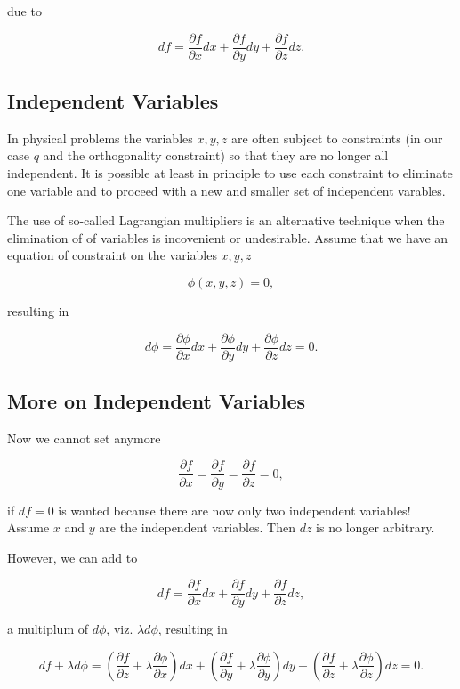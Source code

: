 \documentclass[%
oneside,                 %
final,                   %
10pt]{article}
\begin{document}
due to

\[
df = \frac{\partial f}{\partial x}dx+\frac{\partial f}{\partial y}dy+\frac{\partial f}{\partial z}dz.
\]

\subsection*{Independent Variables}

In physical problems the variables $x,y,z$ are often subject to constraints (in our case $q$ and the orthogonality constraint)
so that they are no longer all independent. It is possible at least in principle to use each constraint to eliminate one variable
and to proceed with a new and smaller set of independent varables.

The use of so-called Lagrangian  multipliers is an alternative technique  when the elimination of
of variables is incovenient or undesirable.  Assume that we have an equation of constraint on the variables $x,y,z$

\[
\phi(x,y,z) = 0,
\]

 resulting in

\[
d\phi = \frac{\partial \phi}{\partial x}dx+\frac{\partial \phi}{\partial y}dy+\frac{\partial \phi}{\partial z}dz =0.
\]

\subsection*{More on Independent Variables}

Now we cannot set anymore

\[
\frac{\partial f}{\partial x} =\frac{\partial f}{\partial y}=\frac{\partial f}{\partial z}=0,
\]

if $df=0$ is wanted
because there are now only two independent variables!  Assume $x$ and $y$ are the independent variables.
Then $dz$ is no longer arbitrary.

However, we can add to

\[
df = \frac{\partial f}{\partial x}dx+\frac{\partial f}{\partial y}dy+\frac{\partial f}{\partial z}dz,
\]

a multiplum of $d\phi$, viz. $\lambda d\phi$, resulting  in

\[
df+\lambda d\phi = (\frac{\partial f}{\partial z}+\lambda\frac{\partial \phi}{\partial x})dx+(\frac{\partial f}{\partial y}+\lambda\frac{\partial \phi}{\partial y})dy+(\frac{\partial f}{\partial z}+\lambda\frac{\partial \phi}{\partial z})dz =0.
\]
\end{document}
